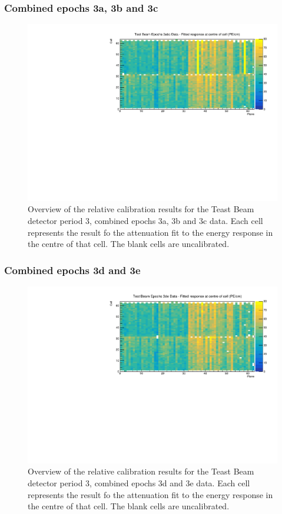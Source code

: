 \documentclass[12pt,a4paper]{article}
\begin{document}
\subsubsection*{Combined epochs 3a, 3b and 3c}

\begin{figure}[!hbtp]
\centering
\includegraphics[width=\textwidth]{Plots/CellResponseAtCentre_epoch3abc_Limited.pdf}
\caption{Overview of the relative calibration results for the Teast Beam detector period 3, combined epochs 3a, 3b and 3c data. Each cell represents the result fo the attenuation fit to the energy response in the centre of that cell. The blank cells are uncalibrated.}
\end{figure}

\subsubsection*{Combined epochs 3d and 3e}

\begin{figure}[!hbtp]
\centering
\includegraphics[width=\textwidth]{Plots/CellResponseAtCentre_epoch3de_Limited.pdf}
\caption{Overview of the relative calibration results for the Teast Beam detector period 3, combined epochs 3d and 3e data. Each cell represents the result fo the attenuation fit to the energy response in the centre of that cell. The blank cells are uncalibrated.}
\end{figure}
\end{document}
